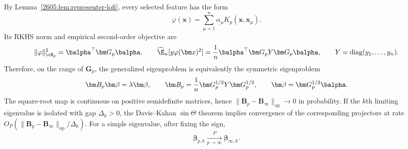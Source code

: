 By Lemma~\ref{2605:lem:representer-lofi}, every selected feature has the form
\[
    \varphi(\bm x)=\sum_{\mu=1}^n \alpha_\mu K_p(\bm x,\bm x_\mu).
\]
Its RKHS norm and empirical second-order objective are
\[
    \|\varphi\|_{\cH_p}^2=\balpha^\top \bm G_p\balpha,\qquad
    \widehat{\E}_n[y\varphi(\bm x)^2]
    =
    \frac1n\balpha^\top \bm G_p Y \bm G_p\balpha,
    \qquad
    Y=\operatorname{diag}(y_1,\dots,y_n).
\]
Therefore, on the range of $\bm G_p$, the generalized eigenproblem is equivalently the
symmetric eigenproblem
\begin{equation}
    \bm B_p \bm\beta=\lambda \bm\beta,\qquad
    \bm B_p
    =
    \frac1n \bm G_p^{1/2}Y\bm G_p^{1/2},\qquad
    \bm\beta=\bm G_p^{1/2}\balpha.
    \label{2605:eq:symmetric-dual-eigenproblem}
\end{equation}
The square-root map is continuous on positive semidefinite matrices, hence
$\|\bm B_p-\bm B_\infty\|_{\mathrm{op}}\to 0$ in probability. If the $k$th limiting eigenvalue is
isolated with gap $\Delta_k>0$, the Davis--Kahan $\sin\Theta$ theorem
\cite{davis1970rotation} implies convergence of the corresponding projectors at
rate $O_P(\|\bm B_p-\bm B_\infty\|_{\mathrm{op}}/\Delta_k)$. For a simple eigenvalue, after fixing
the sign,
\begin{equation}
    \bm\beta_{p,k}\xrightarrow[p\to\infty]{P}\bm\beta_{\infty,k}.
    \label{2605:eq:beta-conv}
\end{equation}


